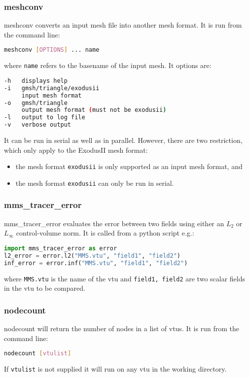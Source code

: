 \subsubsection{meshconv}
\label{sec:meshconv}
meshconv converts an input mesh file into another mesh format. It is run from the command line:
\begin{lstlisting}[language = Bash]
meshconv [OPTIONS] ... name
\end{lstlisting}
where \texttt{name} refers to the basename of the input mesh. It options are:
\begin{lstlisting}[language = Bash]
-h   displays help
-i   gmsh/triangle/exodusii
     input mesh format
-o   gmsh/triangle
     output mesh format (must not be exodusii)
-l   output to log file
-v   verbose output
\end{lstlisting}
It can be run in serial as well as in parallel. However, there are two restriction, which only apply to the ExodusII mesh format:
\begin{itemize}
 \item the mesh format \texttt{exodusii} is only supported as an input mesh format, and
 \item the mesh format \texttt{exodusii} can only be run in serial.
\end{itemize}



\subsubsection{mms\_tracer\_error}
\label{sec:mms_tracer_error}

mms\_tracer\_error evaluates the error between two fields using either an $L_2$ or $L_\infty$ control-volume norm. It is called from a python script e.g.:
\begin{lstlisting}[language = python]
import mms_tracer_error as error
l2_error = error.l2("MMS.vtu", "field1", "field2")
inf_error = error.inf("MMS.vtu", "field1", "field2")
\end{lstlisting}
where \lstinline[language = python]+MMS.vtu+ is the name of the vtu and \lstinline[language = python]+field1, field2+ are two scalar fields in the vtu to be compared.


\subsubsection{nodecount}
\label{sec:nodecount}
nodecount will return the number of nodes in a list of vtus. It is run from the command line:
\begin{lstlisting}[language = Bash]
nodecount [vtulist]
\end{lstlisting}
If \lstinline[language = Bash]+vtulist+ is not supplied it will run on any vtu in the working directory.

